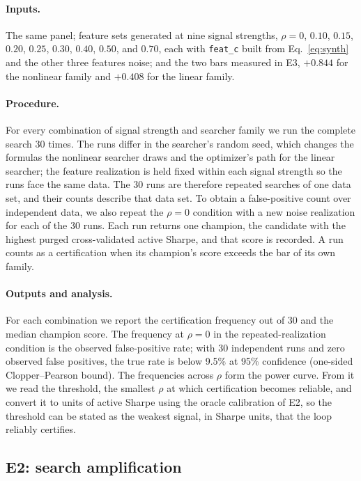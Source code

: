 \documentclass[11pt]{article}
\newcommand{\code}[1]{\texttt{#1}}
\begin{document}
\paragraph{Inputs.} The same panel; feature sets generated at nine signal strengths, $\rho = 0$,
$0.10$, $0.15$, $0.20$, $0.25$, $0.30$, $0.40$, $0.50$, and $0.70$, each with \code{feat\_c} built from
Eq.~\eqref{eq:synth} and the other three features noise; and the two bars measured in E3, $+0.844$ for
the nonlinear family and $+0.408$ for the linear family.

\paragraph{Procedure.} For every combination of signal strength and searcher family we run the complete
search 30 times. The runs differ in the searcher's random seed, which changes the formulas the nonlinear
searcher draws and the optimizer's path for the linear searcher; the feature realization is held fixed
within each signal strength so the runs face the same data. The 30 runs are therefore repeated searches
of one data set, and their counts describe that data set. To obtain a false-positive count over
independent data, we also repeat the $\rho=0$ condition with a new noise realization for each of the 30
runs. Each run returns one champion, the candidate
with the highest purged cross-validated active Sharpe, and that score is recorded. A run counts as a
certification when its champion's score exceeds the bar of its own family.

\paragraph{Outputs and analysis.} For each combination we report the certification frequency out of 30
and the median champion score. The frequency at $\rho=0$ in the repeated-realization condition is the
observed false-positive rate; with 30 independent runs and zero observed false positives, the true rate
is below 9.5\% at 95\% confidence (one-sided Clopper--Pearson bound). The frequencies across $\rho$ form the power curve. From it we read the threshold,
the smallest $\rho$ at which certification becomes reliable, and convert it to units of active Sharpe
using the oracle calibration of E2, so the threshold can be stated as the weakest signal, in Sharpe
units, that the loop reliably certifies.

\subsection{E2: search amplification}
\end{document}
